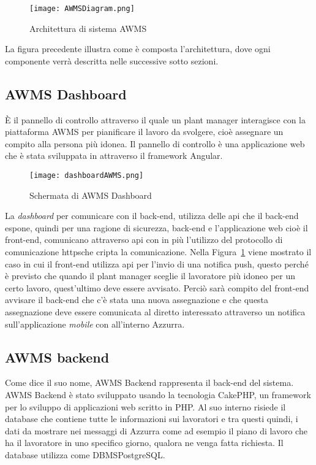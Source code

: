  \begin{figure}[h]
 	\begin{center}
 		\texttt{[image: AWMSDiagram.png]}
 		\caption{Architettura di sistema AWMS}\label{fig:arch}
 	\end{center}
 \end{figure}
La figura precedente illustra come è composta l'\gls{architettura}\ap{[g]}, dove ogni componente verrà descritta nelle successive sotto sezioni.
\begin{trivlist}
	\item \subsection{AWMS Dashboard}
	È il pannello di controllo attraverso il quale un \gls{plant manager}\ap{[g]} interagisce con la piattaforma \gls{AWMS} per pianificare il lavoro da svolgere, cioè assegnare un compito alla persona più idonea. Il pannello di controllo è una applicazione web che è stata sviluppata in attraverso il \gls{framework}\ap{[g]} Angular.
	\begin{figure}[h] 
		\begin{center}
			\texttt{[image: dashboardAWMS.png]}
			\caption{Schermata di AWMS Dashboard}
		\end{center}
	\end{figure}
	 	La \emph{dashboard} per comunicare con il \gls{back-end}\ap{[g]}, utilizza delle \gls{api}\ap{[g]} che il back-end espone, quindi per una ragione di sicurezza, back-end e l'applicazione web cioè il front-end, comunicano attraverso \gls{api}\ap{[g]} con in più l'utilizzo del protocollo di comunicazione \gls{https}\glsfirstoccur che cripta la comunicazione. Nella Figura~\ref{fig:arch} viene mostrato il caso in cui il front-end utilizza \gls{api}\ap{[g]} per l'invio di una \gls{notifica push}\ap{[g]}, questo perché è previsto che quando il \gls{plant manager}\ap{[g]} sceglie il lavoratore più idoneo per un certo lavoro, quest'ultimo deve essere avvisato. Perciò sarà compito del front-end avvisare il back-end che c'è stata una nuova assegnazione e che questa assegnazione deve essere comunicata al diretto interessato attraverso un notifica sull'applicazione \emph{mobile} con all'interno Azzurra.
	\item \subsection{AWMS backend}
	Come dice il suo nome, AWMS Backend rappresenta il back-end del sistema. AWMS Backend è stato sviluppato usando la tecnologia CakePHP, un \gls{framework}\ap{[g]} per lo sviluppo di applicazioni web scritto in PHP. Al suo interno risiede il \gls{database}\ap{[g]} che contiene tutte le informazioni sui lavoratori e tra questi quindi, i dati da mostrare nei messaggi di Azzurra come ad esempio il piano di lavoro che ha il lavoratore in uno specifico giorno, qualora ne venga fatta richiesta. Il database utilizza come \gls{DBMS}\glsfirstoccur PostgreSQL. \\
	

\end{trivlist}
